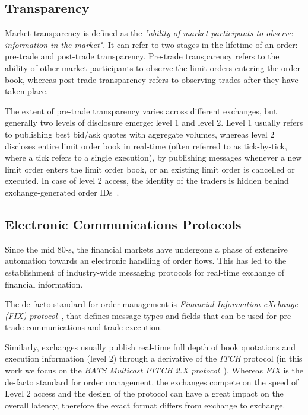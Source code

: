 \subsection{Transparency}
\label{Chapters/Background/Transparency}
Market transparency is defined as the \textit{"ability of market participants to observe information in the market"}\cite{Comerton2004}. It can refer to two stages in the lifetime of an order: pre-trade and post-trade transparency. Pre-trade transparency refers to the ability of other market participants to observe the limit orders entering the order book, whereas post-trade transparency refers to observing trades after they have taken place.

The extent of pre-trade transparency varies across different exchanges, but generally two levels of disclosure emerge: level 1 and level 2. Level 1 usually refers to publishing best bid/ask quotes  with aggregate volumes, whereas level 2 discloses entire limit order book in real-time (often referred to as tick-by-tick, where a tick refers to a single execution), by publishing messages whenever a new limit order enters the limit order book, or an existing limit order is cancelled or executed. In case of level 2 access, the identity of the traders is hidden behind exchange-generated order IDs~\cite{Comerton2004}.

\subsection{Electronic Communications Protocols}
\label{Chapters/Background/Electronic-Communications-Protocols}
Since the mid 80-s, the financial markets have undergone a phase of extensive automation towards an electronic handling of order flows. This has led to the establishment of industry-wide messaging protocols for real-time exchange of financial information. 

The de-facto standard for order management is \textit{Financial Information eXchange (FIX) protocol}~\cite{FIX5}, that defines message types and fields that can be used for pre-trade communications and trade execution.

Similarly, exchanges usually publish real-time full depth of book quotations and execution information (level 2) through a derivative of the \textit{ITCH} protocol (in this work we focus on the \textit{BATS Multicast PITCH 2.X protocol}~\cite{BATSPITCH}). Whereas \textit{FIX} is the de-facto standard for order management, the exchanges compete on the speed of Level 2 access and the design of the protocol can have a great impact on the overall latency, therefore the exact format differs from exchange to exchange.
